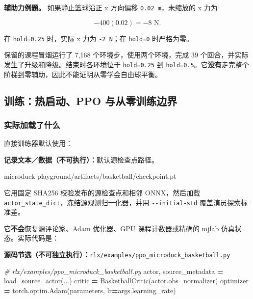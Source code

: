 \documentclass[
  chinese,
  11pt,
  letterpaper,
]{article}
\newenvironment{Shaded}{\begin{snugshade}}{\end{snugshade}}
\newcommand{\CommentTok}[1]{\textcolor[rgb]{0.56,0.35,0.01}{\textit{#1}}}
\newcommand{\NormalTok}[1]{#1}
\newcommand{\OperatorTok}[1]{\textcolor[rgb]{0.81,0.36,0.00}{\textbf{#1}}}
\renewenvironment{Shaded}{\par\smallskip}{\par\smallskip}
\begin{document}
\textbf{辅助力例题。} 如果静止篮球沿正 x 方向偏移
\texttt{0.02\ m}，未缩放的 x 力为

\[
-400(0.02)=-8\text{ N}.
\]

在 \texttt{hold=0.25} 时，实际 x 力为 \texttt{-2\ N}；在 \texttt{hold=0}
时严格为零。

保留的课程冒烟运行了 7,168 个环境步，使用两个环境，完成 39
个回合，并实际发生了升级和降级。结束时各环境位于 \texttt{hold=0.25} 到
\texttt{hold=0.5}。它\textbf{没有}走完整个阶梯到零辅助，因此不能证明从零学会自由球平衡。

\subsection{训练：热启动、PPO
与从零训练边界}\label{ux8badux7ec3ux70edux542fux52a8ppo-ux4e0eux4eceux96f6ux8badux7ec3ux8fb9ux754c}

\subsubsection{实际加载了什么}\label{ux5b9eux9645ux52a0ux8f7dux4e86ux4ec0ux4e48}

直接训练器默认使用：

\textbf{记录文本／数据（不可执行）：}默认源检查点路径。

\begin{Shaded}
\begin{Highlighting}[]
\NormalTok{microduck{-}playground/artifacts/basketball/checkpoint.pt}
\end{Highlighting}
\end{Shaded}

它用固定 SHA256 校验发布的源检查点和相邻 ONNX，然后加载
\texttt{actor\_\allowbreak{}state\_\allowbreak{}dict}，冻结源观测归一化器，并用
\texttt{-\allowbreak{}-\allowbreak{}initial-\allowbreak{}std}
覆盖演员探索标准差。

它\textbf{不会}恢复源评论家、Adam 优化器、GPU 课程计数器或精确的 mjlab
仿真状态。实际代码是：

\textbf{源码节选（不可独立执行）：}\texttt{rlx/\allowbreak{}examples\allowbreak{}/\allowbreak{}ppo\_\allowbreak{}microduc\allowbreak{}k\_\allowbreak{}basketba\allowbreak{}ll.py}

\begin{Shaded}
\begin{Highlighting}[]
\CommentTok{\# rlx/examples/ppo\_microduck\_basketball.py}
\NormalTok{actor, source\_metadata }\OperatorTok{=}\NormalTok{ load\_source\_actor(...)}
\NormalTok{critic }\OperatorTok{=}\NormalTok{ BasketballCritic(actor.obs\_normalizer)}
\NormalTok{optimizer }\OperatorTok{=}\NormalTok{ torch.optim.Adam(parameters, lr}\OperatorTok{=}\NormalTok{args.learning\_rate)}
\end{Highlighting}
\end{Shaded}
\end{document}
